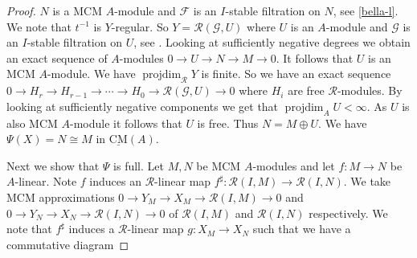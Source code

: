 \documentclass{amsart}
\newcommand{\eR}{\mathcal{R} }
\newcommand{\Fc}{\mathcal{F} }
\newcommand{\Gc}{\mathcal{G} }
\newcommand{\rt}{\rightarrow}
\newcommand{\CMS}{\operatorname{\underline{CM}}}
\newcommand{\projdim}{\operatorname{projdim}}
\theoremstyle{plain}
\theoremstyle{definition}
\theoremstyle{remark}
\begin{document}
{\begin{proof}
$N$ is a MCM $A$-module and $\Fc$ is an $I$-stable filtration on $N$, see \ref{bella-l}. We note that $t^{-1}$ is $Y$-regular. So $Y =  \eR(\Gc, U)$ where
$U$ is an $A$-module and $\Gc$ is an $I$-stable filtration on $U$, see \cite[3.1]{P-Itoh-g}. Looking at sufficiently negative degrees we obtain an exact sequence of $A$-modules $0 \rt U \rt N \rt M \rt 0$.
It follows that $U$ is an MCM  $A$-module.
We have $\projdim_{\eR} Y$ is finite. So we have an exact sequence
$0 \rt H_r \rt H_{r-1} \rt \cdots \rt H_0 \rt \eR(\Gc, U) \rt 0$ where $H_i$ are free $\eR$-modules. By looking at sufficiently negative components we get that $\projdim_A U < \infty$. As $U$ is also MCM $A$-module it follows that $U$ is free.
Thus $N = M \oplus U$. We have $\Psi(X) = N \cong M$ in $\CMS(A)$.


Next we show that $\Psi$ is full. Let $M, N$ be MCM $A$-modules and let $f \colon M \rt N$ be $A$-linear. Note $f$ induces an $\eR$-linear map $f^\sharp \colon \eR(I, M) \rt \eR(I, N)$. We take MCM approximations $0 \rt Y_M \rt X_M \rt \eR(I, M) \rt 0$ and $0 \rt Y_N \rt X_N \rt \eR(I, N) \rt 0$  of $\eR(I, M)$ and $\eR(I, N)$ respectively. We note that $f^\sharp$ induces a $\eR$-linear map $g \colon X_M \rt X_N$ such that we have a commutative diagram


\end{proof}}
\end{document}
